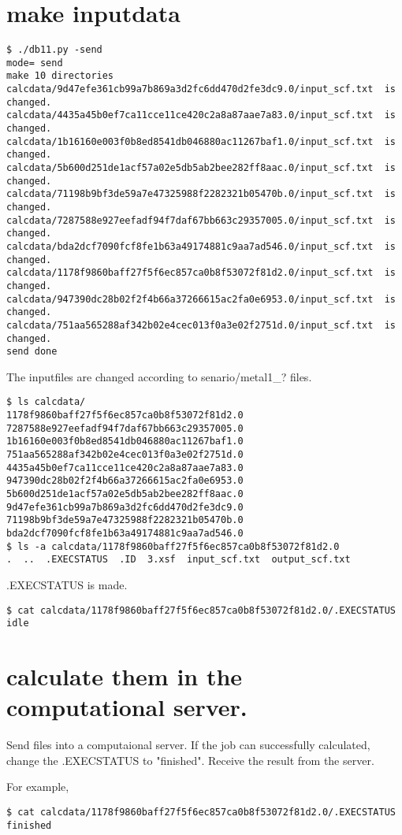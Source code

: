 \documentclass[a4paper]{article}
\begin{document}
\section{make inputdata}
\begin{verbatim}
$ ./db11.py -send
mode= send
make 10 directories
calcdata/9d47efe361cb99a7b869a3d2fc6dd470d2fe3dc9.0/input_scf.txt  is changed.
calcdata/4435a45b0ef7ca11cce11ce420c2a8a87aae7a83.0/input_scf.txt  is changed.
calcdata/1b16160e003f0b8ed8541db046880ac11267baf1.0/input_scf.txt  is changed.
calcdata/5b600d251de1acf57a02e5db5ab2bee282ff8aac.0/input_scf.txt  is changed.
calcdata/71198b9bf3de59a7e47325988f2282321b05470b.0/input_scf.txt  is changed.
calcdata/7287588e927eefadf94f7daf67bb663c29357005.0/input_scf.txt  is changed.
calcdata/bda2dcf7090fcf8fe1b63a49174881c9aa7ad546.0/input_scf.txt  is changed.
calcdata/1178f9860baff27f5f6ec857ca0b8f53072f81d2.0/input_scf.txt  is changed.
calcdata/947390dc28b02f2f4b66a37266615ac2fa0e6953.0/input_scf.txt  is changed.
calcdata/751aa565288af342b02e4cec013f0a3e02f2751d.0/input_scf.txt  is changed.
send done
\end{verbatim}
The inputfiles are changed according to senario/metal1\_? files.
\begin{verbatim}
$ ls calcdata/
1178f9860baff27f5f6ec857ca0b8f53072f81d2.0  7287588e927eefadf94f7daf67bb663c29357005.0
1b16160e003f0b8ed8541db046880ac11267baf1.0  751aa565288af342b02e4cec013f0a3e02f2751d.0
4435a45b0ef7ca11cce11ce420c2a8a87aae7a83.0  947390dc28b02f2f4b66a37266615ac2fa0e6953.0
5b600d251de1acf57a02e5db5ab2bee282ff8aac.0  9d47efe361cb99a7b869a3d2fc6dd470d2fe3dc9.0
71198b9bf3de59a7e47325988f2282321b05470b.0  bda2dcf7090fcf8fe1b63a49174881c9aa7ad546.0
$ ls -a calcdata/1178f9860baff27f5f6ec857ca0b8f53072f81d2.0
.  ..  .EXECSTATUS  .ID  3.xsf  input_scf.txt  output_scf.txt
\end{verbatim}
.EXECSTATUS is made. 
\begin{verbatim}
$ cat calcdata/1178f9860baff27f5f6ec857ca0b8f53072f81d2.0/.EXECSTATUS 
idle
\end{verbatim}


\section{calculate them in the computational server.}
Send files into a computaional server.
If the job can successfully calculated, change the .EXECSTATUS to "finished".
Receive the result from the server.

For example,
\begin{verbatim}
$ cat calcdata/1178f9860baff27f5f6ec857ca0b8f53072f81d2.0/.EXECSTATUS 
finished
\end{verbatim}
\end{document}
